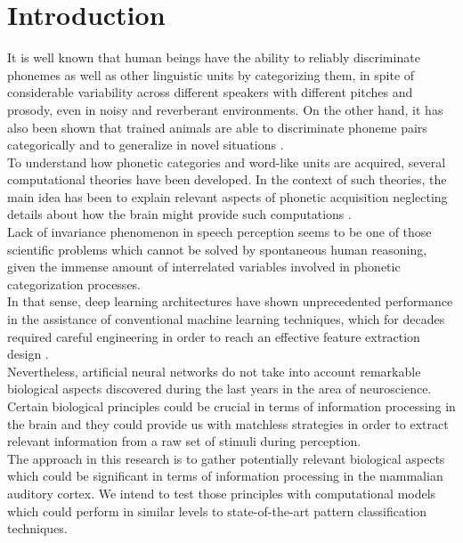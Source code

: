 \documentclass[11pt,a4paper]{article}
\begin{document}
\section{Introduction}

It is well known that human beings have the ability to reliably discriminate phonemes
as well as other linguistic units by categorizing them,
in spite of considerable variability across different speakers
with different pitches and prosody, even in noisy and reverberant
environments.
On the other hand, it has also been shown that trained animals
are able to discriminate phoneme
pairs categorically and to generalize in novel situations
\cite{kuhl_1975, kuhl_1983, kluender_1998, pons_2006, hienz_1996, dent_1997, lotto_1997}. \\

To understand how phonetic categories and word-like units
are acquired, several computational theories have been developed.
In the context of such theories, the main idea has
been to explain relevant aspects of phonetic acquisition neglecting details
about how the brain might provide such
computations \cite{rasanen_2012}. \\

Lack of invariance phenomenon in speech perception
\cite{appelbaum_1996}
seems to be one of those scientific problems which
cannot be solved by spontaneous human reasoning,
given the immense amount of interrelated variables
involved in phonetic categorization processes. \\

In that sense, deep learning architectures have shown
unprecedented performance in the assistance of
conventional machine learning techniques, which for decades 
required careful engineering
in order to reach an effective feature extraction design
\cite{lecun_2015}. \\

Nevertheless, artificial neural networks do not take into account
remarkable biological aspects discovered during the last years
in the area of neuroscience.
Certain biological principles could be crucial in terms of
information processing in the brain and they could
provide us with matchless strategies in order to extract
relevant information from a raw set of stimuli
during perception. \\

The approach in this research is to gather
potentially relevant biological aspects which could be
significant in terms of information processing
in the mammalian auditory cortex. We intend to test those principles
with computational models which could
perform in similar levels to state-of-the-art pattern classification techniques. \\
\end{document}

